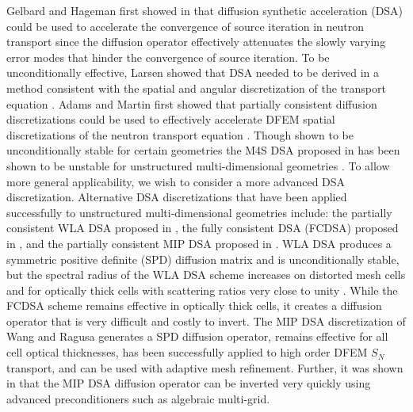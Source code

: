 \documentclass[final,3p,times]{elsarticle}
\begin{document}
Gelbard and Hageman first showed in \cite{old_dsa} that diffusion synthetic acceleration (DSA) could be used to accelerate the convergence of source iteration in neutron transport since the diffusion operator effectively attenuates the slowly varying error modes that hinder the convergence of source iteration.
To be unconditionally effective, Larsen showed that DSA needed to be derived in a method consistent with the spatial and angular discretization of the transport equation \cite{larsen_dsa}.
Adams and Martin first showed that partially consistent diffusion discretizations could be used to effectively accelerate DFEM spatial discretizations of the neutron transport equation \cite{adams_dsa}.
Though shown to be unconditionally stable for certain geometries the M4S DSA proposed in \cite{adams_dsa} has been shown to be unstable for unstructured multi-dimensional geometries \cite{wwm_dsa}.
To allow more general applicability, we wish to consider a more advanced DSA discretization.
Alternative DSA discretizations that have been applied successfully to unstructured multi-dimensional geometries include: the partially consistent WLA DSA proposed in \cite{wla_dsa}, the fully consistent DSA (FCDSA) proposed in \cite{wwm_dsa}, and the partially consistent MIP DSA proposed in \cite{mip_dsa}.
WLA DSA produces a symmetric positive definite (SPD) diffusion matrix and is unconditionally stable, but the spectral radius of the WLA DSA scheme increases on distorted mesh cells and for optically thick cells with scattering ratios very close to unity \cite{wla_dsa,wwm_dsa}.
While the FCDSA scheme remains effective in optically thick cells, it creates a diffusion operator that is very difficult and costly to invert. 
The MIP DSA discretization \cite{mip_dsa} of Wang and Ragusa generates a SPD diffusion operator, remains effective for all cell optical thicknesses, has been successfully applied to high order DFEM $S_N$ transport, and can be used with adaptive mesh refinement.
Further, it was shown in \cite{mip_mc} that the MIP DSA diffusion operator can be inverted very quickly using advanced preconditioners such as algebraic multi-grid.
\end{document}
